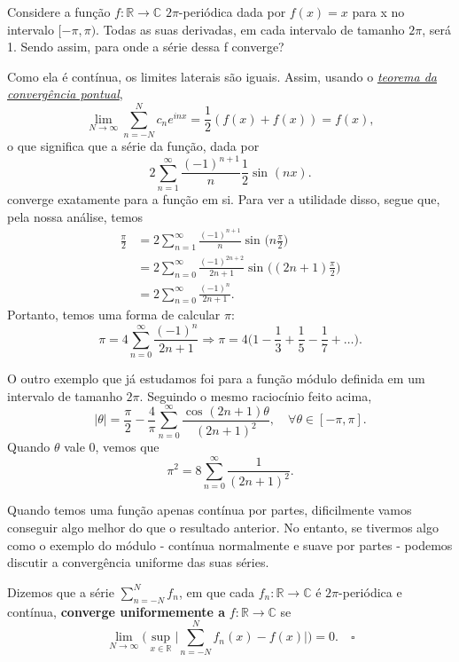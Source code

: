 \documentclass[../pde_notes.tex]{subfiles}
\begin{document}
\begin{example}
	Considere a função \(f:\mathbb{R}\rightarrow \mathbb{C}\) \(2\pi \)-periódica dada por \(f(x) = x\) para x no intervalo \([-\pi , \pi )\). Todas as suas derivadas, em cada intervalo de tamanho \(2\pi \), será 1. Sendo assim, para onde a série dessa f converge?

	Como ela é contínua, os limites laterais são iguais. Assim, usando o \hyperlink{ponintwise_convergence}{\textit{teorema da convergência pontual}},
	\[
		\lim_{N\to \infty}\sum\limits_{n=-N}^{N}c_{n}e^{inx} = \frac{1}{2}(f(x) + f(x)) = f(x),
	\]
	o que significa que a série da função, dada por
	\[
		2\sum\limits_{n=1}^{\infty} \frac{(-1)^{n+1}}{n}\frac{1}{2}\sin^{}{(nx)}.
	\]
	converge exatamente para a função em si. Para ver a utilidade disso, segue que, pela nossa análise, temos
	\begin{align*}
		\frac{\pi }{2} & = 2 \sum\limits_{n=1}^{\infty}\frac{(-1)^{n+1}}{n}\sin^{}{\biggl(n\frac{\pi }{2}\biggr)}        \\
		               & =2\sum\limits_{n=0}^{\infty}\frac{(-1)^{2n+2}}{2n+1}\sin^{}{\biggl((2n+1)\frac{\pi }{2}\biggr)} \\
		               & =2\sum\limits_{n=0}^{\infty}\frac{(-1)^{n}}{2n+1}.
	\end{align*}
	Portanto, temos uma forma de calcular \(\pi \):
	\[
		\pi = 4\sum\limits_{n=0}^{\infty}\frac{(-1)^{n}}{2n+1} \Rightarrow \pi = 4 \biggl(1 - \frac{1}{3} + \frac{1}{5} - \frac{1}{7} + \dotsc \biggr).
	\]
\end{example}
\begin{example}
	O outro exemplo que já estudamos foi para a função módulo definida em um intervalo de tamanho \(2\pi \). Seguindo o mesmo raciocínio feito acima,
	\[
		|\theta | = \frac{\pi }{2} - \frac{4}{\pi }\sum\limits_{n=0}^{\infty}\frac{\cos^{}{(2n+1)\theta }}{(2n+1)^{2}},\quad \forall \theta \in [-\pi , \pi ].
	\]
	Quando \(\theta \) vale 0, vemos que
	\[
		\pi^{2} = 8 \sum\limits_{n=0}^{\infty}\frac{1}{(2n+1)^{2}}.
	\]
\end{example}
Quando temos uma função apenas contínua por partes, dificilmente vamos conseguir algo melhor do que o resultado anterior. No entanto, se tivermos algo como o exemplo do módulo - contínua normalmente e suave por partes - podemos discutir a convergência uniforme das suas séries.
\begin{def*}
	Dizemos que a série \(\sum\limits_{n=-N}^{N}f_{n}\), em que cada \(f_{n}:\mathbb{R}\rightarrow \mathbb{C}\) é \(2\pi \)-periódica e contínua, \textbf{converge uniformemente a }\(f:\mathbb{R}\rightarrow \mathbb{C}\) se
	\[
		\lim_{N\to \infty}\biggl(\sup_{x\in \mathbb{R}}\biggl\vert \sum\limits_{n=-N}^{N}f_{n}(x) - f(x) \biggr\vert\biggr) = 0.\quad \square
	\]
\end{def*}
\end{document}

